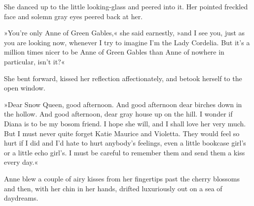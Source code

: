 She danced up to the little looking-glass and peered into it. Her pointed freckled face and solemn gray eyes peered back at her.

»You’re only Anne of Green Gables,« she said earnestly, »and I see you, just as you are looking now, whenever I try to imagine I’m the Lady Cordelia. But it’s a million times nicer to be Anne of Green Gables than Anne of nowhere in particular, isn’t it?«

She bent forward, kissed her reflection affectionately, and betook herself to the open window.

»Dear Snow Queen, good afternoon. And good afternoon dear birches down in the hollow. And good afternoon, dear gray house up on the hill. I wonder if Diana is to be my bosom friend. I hope she will, and I shall love her very much. But I must never quite forget Katie Maurice and Violetta. They would feel so hurt if I did and I’d hate to hurt anybody’s feelings, even a little bookcase girl’s or a little echo girl’s. I must be careful to remember them and send them a kiss every day.«

Anne blew a couple of airy kisses from her fingertips past the cherry blossoms and then, with her chin in her hands, drifted luxuriously out on a sea of daydreams.